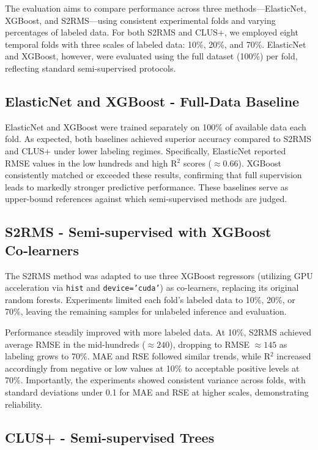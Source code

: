 The evaluation aims to compare performance across three methods—ElasticNet, XGBoost, and S2RMS—using consistent experimental folds and varying percentages of labeled data. For both S2RMS and CLUS+, we employed eight temporal folds with three scales of labeled data: 10\%, 20\%, and 70\%. ElasticNet and XGBoost, however, were evaluated using the full dataset (100\%) per fold, reflecting standard semi-supervised protocols.

\subsection{ElasticNet and XGBoost - Full-Data Baseline}

ElasticNet and XGBoost were trained separately on 100\% of available data each fold. As expected, both baselines achieved superior accuracy compared to S2RMS and CLUS+ under lower labeling regimes. Specifically, ElasticNet reported RMSE values in the low hundreds and high R$^2$ scores ($\approx0.66$). XGBoost consistently matched or exceeded these results, confirming that full supervision leads to markedly stronger predictive performance. These baselines serve as upper-bound references against which semi-supervised methods are judged.

\subsection{S2RMS - Semi-supervised with XGBoost Co‑learners}

The S2RMS method was adapted to use three XGBoost regressors (utilizing GPU acceleration via \texttt{hist} and \texttt{device='cuda'}) as co-learners, replacing its original random forests. Experiments limited each fold's labeled data to 10\%, 20\%, or 70\%, leaving the remaining samples for unlabeled inference and evaluation.

Performance steadily improved with more labeled data. At 10\%, S2RMS achieved average RMSE in the mid-hundreds ($\approx240$), dropping to RMSE $\approx145$ as labeling grows to 70\%. MAE and RSE followed similar trends, while R$^2$ increased accordingly from negative or low values at 10\% to acceptable positive levels at 70\%. Importantly, the experiments showed consistent variance across folds, with standard deviations under 0.1 for MAE and RSE at higher scales, demonstrating reliability.

\subsection{CLUS+ - Semi-supervised Trees}


